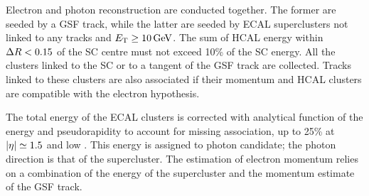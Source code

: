 Electron and photon reconstruction are conducted together.
The former are seeded by a GSF track, while the latter are seeded by ECAL superclusters not linked to any tracks and $E_{\mathrm{T}} \geq 10 \,\text{Ge\hspace{-.08em}V}$.
The sum of HCAL energy within $\Delta R < 0.15$ of the SC centre must not exceed 10\usep\% of the SC energy.
All the clusters linked to the SC or to a tangent of the GSF track are collected.
Tracks linked to these clusters are also associated if their momentum and HCAL clusters are compatible with the electron hypothesis.

The total energy of the ECAL clusters is corrected with analytical function of the energy and pseudorapidity to account for missing association,
up to 25\usep\% at $\lvert \eta \rvert \simeq 1.5$ and low \pt.
This energy is assigned to photon candidate; the photon direction is that of the supercluster.
The estimation of electron momentum
relies on a combination of the energy of the supercluster and the momentum estimate of the GSF track.
